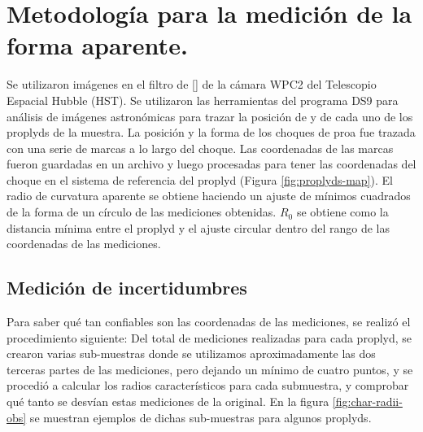 \section{Metodología para la medición de la forma aparente.}
\label{sec:methodology}
Se utilizaron imágenes en el filtro de [] de la cámara WPC2 del Telescopio Espacial Hubble (HST). Se utilizaron las herramientas del programa DS9 para análisis de imágenes astronómicas para trazar la posición de \thC{} y de cada uno de los proplyds de la muestra. La posición y la forma de los choques de proa fue
trazada con una serie de marcas a lo largo del choque. Las coordenadas de las marcas fueron guardadas en un archivo y luego procesadas para tener las coordenadas del choque en el sistema de referencia del proplyd (Figura \ref{fig:proplyds-map}). El radio de curvatura aparente se obtiene haciendo un ajuste de mínimos cuadrados de la forma de un círculo de las mediciones obtenidas. $R_0$ se obtiene como la distancia mínima entre el proplyd y el ajuste circular dentro del rango de las coordenadas de las mediciones. 

\subsection{Medición de incertidumbres}

Para saber qué tan confiables son las coordenadas de las mediciones, se realizó el procedimiento siguiente: Del total de mediciones realizadas para cada proplyd, se crearon varias sub-muestras donde se utilizamos aproximadamente las dos terceras partes de las mediciones, pero dejando un mínimo de cuatro puntos, y se procedió a calcular los radios característicos para cada submuestra, y comprobar qué tanto se desvían estas mediciones de la original. En la figura \ref{fig:char-radii-obs} se muestran ejemplos de dichas sub-muestras para algunos proplyds.


